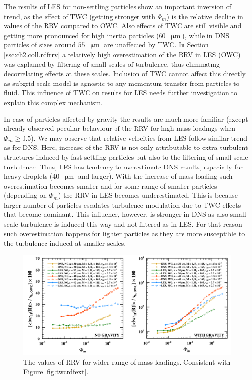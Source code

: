 \documentclass{pracamgren}
\begin{document}
The results of LES for non-settling particles show an important inversion of trend, as the effect of TWC (getting stronger with $\Phi_m$) is the relative decline in values of the RRV compared to OWC.
Also effects of TWC are still visible and getting more pronounced for high inertia particles ($60$~$\upmu\text{m}$), while in DNS particles of sizes around $55$~$\upmu\text{m}$ \parencite[Figure~22a therein]{Rosa2020} are unaffected by TWC.
In Section \ref{ssc:ch2.coll.rdfrrv} a relatively high overestimation of the RRV in LES (OWC) was explained by filtering of small-scales of turbulence, thus eliminating decorrelating effects at these scales.
Inclusion of TWC cannot affect this directly as subgrid-scale model is agnostic to any momentum transfer from particles to fluid.
This influence of TWC on results for LES needs further investigation to explain this complex mechanism.

In case of particles affected by gravity the results are much more familiar (except already observed peculiar behaviour of the RRV for high mass loadings when $\Phi_m  \ge 0.5$).
We may observe that relative velocities from LES follow similar trend as for DNS.
Here, increase of the RRV is not only attributable to extra turbulent structures induced by fast settling particles but also to the filtering of small-scale turbulence.
Thus, LES has tendency to overestimate DNS results, especially for heavy droplets ($40$~$\upmu\text{m}$ and larger).
With the increase of mass loading such overestimation becomes smaller and for some range of smaller particles (depending on $\Phi_m$) the RRV in LES becomes underestimated.
This is because larger number of particles escalates turbulence modulation due to TWC effects that become dominant.
This influence, however, is stronger in DNS as also small scale turbulence is induced this way and not filtered as in LES.
For that reason such overestimation happens for lighter particles as they are more susceptible to the turbulence induced at smaller scales.

\begin{figure}[ht]
\centering
\includegraphics[width=13.5cm]{figures/2-11_twcrrvext.pdf}
\caption{
The values of RRV for wider range of mass loadings.
Consistent with Figure \ref{fig:twcrdfext}.
}
\label{fig:twcrrvext}
\end{figure}
\end{document}
